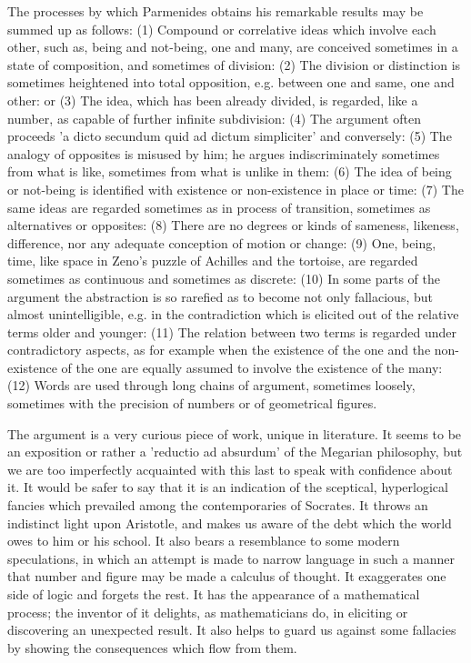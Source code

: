 \documentclass[11pt,letter]{article}
\begin{document}
\par  The processes by which Parmenides obtains his remarkable results may be summed up as follows: (1) Compound or correlative ideas which involve each other, such as, being and not-being, one and many, are conceived sometimes in a state of composition, and sometimes of division: (2) The division or distinction is sometimes heightened into total opposition, e.g. between one and same, one and other: or (3) The idea, which has been already divided, is regarded, like a number, as capable of further infinite subdivision: (4) The argument often proceeds 'a dicto secundum quid ad dictum simpliciter' and conversely: (5) The analogy of opposites is misused by him; he argues indiscriminately sometimes from what is like, sometimes from what is unlike in them: (6) The idea of being or not-being is identified with existence or non-existence in place or time: (7) The same ideas are regarded sometimes as in process of transition, sometimes as alternatives or opposites: (8) There are no degrees or kinds of sameness, likeness, difference, nor any adequate conception of motion or change: (9) One, being, time, like space in Zeno's puzzle of Achilles and the tortoise, are regarded sometimes as continuous and sometimes as discrete: (10) In some parts of the argument the abstraction is so rarefied as to become not only fallacious, but almost unintelligible, e.g. in the contradiction which is elicited out of the relative terms older and younger: (11) The relation between two terms is regarded under contradictory aspects, as for example when the existence of the one and the non-existence of the one are equally assumed to involve the existence of the many: (12) Words are used through long chains of argument, sometimes loosely, sometimes with the precision of numbers or of geometrical figures.

\par  The argument is a very curious piece of work, unique in literature. It seems to be an exposition or rather a 'reductio ad absurdum' of the Megarian philosophy, but we are too imperfectly acquainted with this last to speak with confidence about it. It would be safer to say that it is an indication of the sceptical, hyperlogical fancies which prevailed among the contemporaries of Socrates. It throws an indistinct light upon Aristotle, and makes us aware of the debt which the world owes to him or his school. It also bears a resemblance to some modern speculations, in which an attempt is made to narrow language in such a manner that number and figure may be made a calculus of thought. It exaggerates one side of logic and forgets the rest. It has the appearance of a mathematical process; the inventor of it delights, as mathematicians do, in eliciting or discovering an unexpected result. It also helps to guard us against some fallacies by showing the consequences which flow from them.
\end{document}
